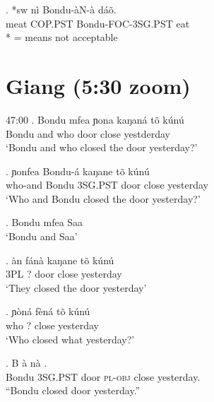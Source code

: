 \documentclass{assets/fieldnotes}
\begin{document}
\exg. *sw nì Bondu-àN-à dáõ.\\
meat COP.PST Bondu-FOC-3SG.PST eat\\

* = means not acceptable

\section{Giang (5:30 zoom)}



47:00
\exg. Bondu  mfea  ɲona kaŋaná tõ kúnú\\
Bondu and who door close yestderday\\
`Bondu and who closed the door yesterday?'


\exg. ɲonfea Bondu-á kaŋane tõ kúnú\\
who-and Bondu 3SG.PST door close yesterday\\
`Who and Bondu closed the door yesterday?'



\exg. Bondu mfea Saa\\
`Bondu and Saa'

\exg. àn fánà kaŋane tõ kúnú\\
3PL    ?   door close yesterday\\
`They closed the door yesterday'




\exg. ɲòná fèná tõ kúnú \\
who ? close yesterday\\
`Who closed what yesterday?'





\exg. B \`a  n\`a  .\\
Bondu \textsc{3SG.PST} door \textsc{pl-obj} close yesterday.\\
``Bondu closed door yesterday.''
\end{document}
